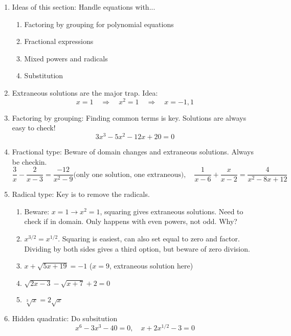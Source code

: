\documentclass{article}
\begin{document}
\begin{enumerate}

\item Ideas of this section: Handle equations with...
\begin{enumerate}
\item Factoring by grouping for polynomial equations
\item Fractional expressions
\item Mixed powers and radicals
\item Substitution
\end{enumerate}


\item Extraneous solutions are the major trap. Idea:
\[
x=1 \quad \Rightarrow \quad x^2=1  \quad \Rightarrow \quad x=-1, 1
\]

\item Factoring by grouping: Finding common terms is key. Solutions are always easy to check!
$$
3x^3-5x^2-12x+20=0
$$

\item Fractional type:  Beware of domain changes and extraneous solutions. Always be checkin.
$$
\frac{3}{x}-\frac{2}{x-3} = \frac{-12}{x^2-9} (\text{only one solution, one extraneous)},\quad \frac{1}{x-6}+\frac{x}{x-2} = \frac{4}{x^2-8x+12}
$$

\item Radical type: Key is to remove the radicals.
\begin{enumerate}
\item Beware: $x=1 \rightarrow x^2=1$, squaring gives extraneous solutions. Need to check if in domain. Only happens with even powers, not odd. Why?
\item $x^{3/2} = x^{1/2}$. Squaring is easiest, can also set equal to zero and factor. Dividing by both sides gives a third option, but beware of zero division.
\item $x+\sqrt{5x+19}=-1$ \quad ($x=9$, extraneous solution here)
\item $\sqrt{2x-3} - \sqrt{x+7} +2 = 0$
\item $\sqrt[3]{x}  = 2\sqrt{x}$
\end{enumerate}

\item Hidden quadratic: Do subsitution
$$
x^6 - 3x^3 - 40 = 0, \quad x+2x^{1/2}-3 = 0
$$
\end{enumerate}
\end{document}
